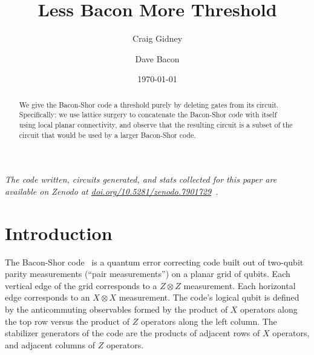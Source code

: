 \documentclass[onecolumn,unpublished,a4paper]{quantumarticle}
\theoremstyle{definition}
\theoremstyle{definition}
\theoremstyle{definition}
\begin{document}
\title{Less Bacon More Threshold}

\date{\today}

\author{Craig Gidney}

\author{Dave Bacon}

\maketitle

\begin{abstract}
We give the Bacon-Shor code a threshold purely by deleting gates from its circuit.
Specifically: we use lattice surgery to concatenate the Bacon-Shor code with itself using local planar connectivity, and observe that the resulting circuit is a subset of the circuit that would be used by a larger Bacon-Shor code.
\end{abstract}

\emph{The code written, circuits generated, and stats collected for this paper are available on Zenodo at \href{https://doi.org/10.5281/zenodo.7901729}{doi.org/10.5281/zenodo.7901729}~\cite{gidneybacondata}.}

\section{Introduction}
\label{sec:introduction}

The Bacon-Shor code~\cite{bacon2006operator} is a quantum error correcting code built out of two-qubit parity measurements (``pair measurements'') on a planar grid of qubits.
Each vertical edge of the grid corresponds to a $Z \otimes Z$ measurement.
Each horizontal edge corresponds to an $X \otimes X$ measurement.
The code's logical qubit is defined by the anticommuting observables formed by the product of $X$ operators along the top row versus the product of $Z$ operators along the left column.
The stabilizer generators of the code are the products of adjacent rows of $X$ operators, and adjacent columns of $Z$ operators.
\end{document}

